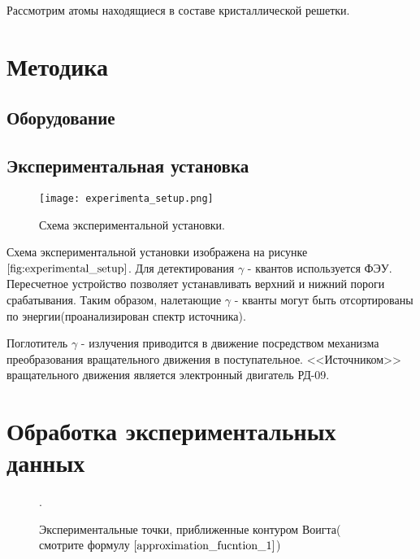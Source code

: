 \documentclass[a4paper, 14pt]{article}
\begin{document}
Рассмотрим атомы находящиеся в составе кристаллической решетки. 

\section*{\textcolor{header}{Методика}}
\subsection*{\textcolor{sub_header}{Оборудование}}


\subsection*{\textcolor{sub_header}{Экспериментальная установка}}

\begin{figure}[hbtp]
    \begin{center}
        \texttt{[image: experimenta\_setup.png]}
        \caption{Схема экспериментальной установки.}
        \label{fig:experimental_setup}
    \end{center}
\end{figure}

Схема экспериментальной установки изображена на рисунке $\ref{fig:experimental_setup}$.
Для детектирования $\gamma$ - квантов используется ФЭУ. Пересчетное устройство позволяет
устанавливать верхний и нижний пороги срабатывания. Таким образом, налетающие $\gamma$ - кванты
могут быть отсортированы по энергии(проанализирован спектр источника).

Поглотитель $\gamma$ - излучения приводится в движение посредством механизма преобразования
вращательного движения в поступательное. <<Источником>> вращательного движения является
электронный двигатель РД-09.






\section*{\textcolor{header}{Обработка экспериментальных данных}}

\begin{figure}[hbtp]
    \begin{center}
        
    \end{center}
    \caption{Экспериментальные точки, приближенные контуром Воигта( смотрите формулу $\ref{approximation_fucntion_1}$)}.
    \label{fig:raw_data}
\end{figure}
\end{document}
